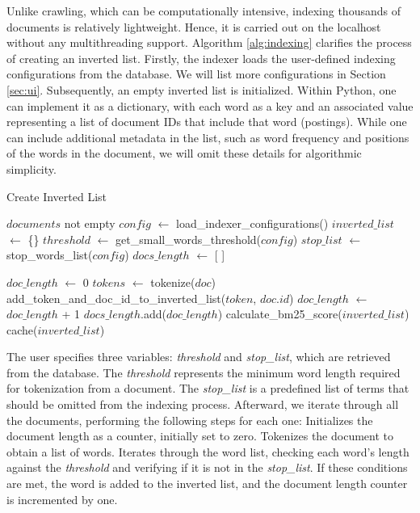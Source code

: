 Unlike crawling, which can be computationally intensive, indexing thousands of documents is relatively lightweight. Hence, it is carried out on the localhost without any multithreading support.
Algorithm \ref{alg:indexing} clarifies the process of creating an inverted list. Firstly, the indexer loads the user-defined indexing configurations from the database. We will list more configurations in Section \ref{sec:ui}. Subsequently, an empty inverted list is initialized. Within Python, one can implement it as a dictionary, with each word as a key and an associated value representing a list of document IDs that include that word (postings). While one can include additional metadata in the list, such as word frequency and positions of the words in the document, we will omit these details for algorithmic simplicity.


\begin{algorithm}[H]
	\caption{Create Inverted List}\label{alg:indexing}
	\begin{algorithmic}[1]
	    \Require $documents$ not empty
		\State $config$ $\gets$ load\_indexer\_configurations() 
		\State $inverted\_list$ $\gets$ \{\} 
		\State $threshold$ $\gets$ get\_small\_words\_threshold($config$)
	    \State $stop\_list$ $\gets$ stop\_words\_list($config$)
     	\State $docs\_length$ $\gets$ [ ] 

          \State $doc\_length$ $\gets$ 0
          \State $tokens$ $\gets$ tokenize($doc$) 
		    	\State add\_token\_and\_doc\_id\_to\_inverted\_list($token$, $doc.id$)
		    	\State $doc\_length$ $\gets$ $doc\_length$ + 1
			\EndIf
          \EndFor
          \State $docs\_length$.add($doc\_length$)
        \EndFor
        \State calculate\_bm25\_score($inverted\_list$) 
        \State cache($inverted\_list$) 

	\end{algorithmic}
\end{algorithm}

The user specifies three variables: \textit{threshold} and \textit{stop\_list}, which are retrieved from the database. The \textit{threshold} represents the minimum word length required for tokenization from a document. The \textit{stop\_list} is a predefined list of terms that should be omitted from the indexing process.
Afterward, we iterate through all the documents, performing the following steps for each one:
Initializes the document length as a counter, initially set to zero.
Tokenizes the document to obtain a list of words.
Iterates through the word list, checking each word's length against the \textit{threshold} and verifying if it is not in the \textit{stop\_list}. If these conditions are met, the word is added to the inverted list, and the document length counter is incremented by one.

